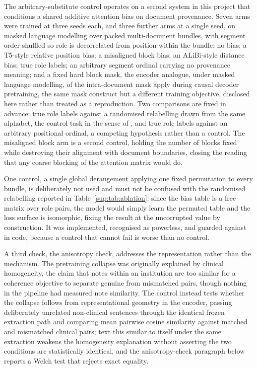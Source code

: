 The arbitrary-substitute control operates on a second system in this project that conditions a
shared additive attention bias on document provenance. Seven arms were trained at three seeds each,
and three further arms at a single seed, on masked language modelling over packed multi-document
bundles, with segment order shuffled so role is decorrelated from position within the bundle: no
bias; a T5-style relative position bias; a misaligned block bias; an ALiBi-style distance bias; true
role labels; an arbitrary segment ordinal carrying no provenance meaning; and a fixed hard block
mask, the encoder analogue, under masked language modelling, of the intra-document mask
\citet{zhao2024seqcomposition} apply during causal decoder pretraining, the same mask construct but
a different training objective, disclosed here rather than treated as a reproduction. Two
comparisons are fixed in advance: true role labels against a randomised relabelling drawn from the
same alphabet, the control task in the sense of \citet{hewitt2019control}, and true role labels
against an arbitrary positional ordinal, a competing hypothesis rather than a control. The
misaligned block arm is a second control, holding the number of blocks fixed while destroying their
alignment with document boundaries, closing the reading that any coarse blocking of the attention
matrix would do.

One control, a single global derangement applying one fixed permutation to every bundle, is
deliberately not used and must not be confused with the randomised relabelling reported in
Table~\ref{sup:tab:ablation}: since the bias table is a free matrix over role pairs, the model would
simply learn the permuted table and the loss surface is isomorphic, fixing the result at the
uncorrupted value by construction. It was implemented, recognised as powerless, and guarded against
in code, because a control that cannot fail is worse than no control.

A third check, the anisotropy check, addresses the representation rather than the mechanism.
The pretraining collapse was originally explained by clinical homogeneity, the claim that notes
within an institution are too similar for a coherence objective to separate genuine from mismatched
pairs, though nothing in the pipeline had measured note similarity. The control instead tests
whether the collapse follows from representational geometry in the encoder, passing deliberately
unrelated non-clinical sentences through the identical frozen extraction path and comparing mean
pairwise cosine similarity against matched and mismatched clinical pairs; text this similar to
itself under the same extraction weakens the homogeneity explanation without asserting the two
conditions are statistically identical, and the anisotropy-check paragraph below reports a Welch
test that rejects exact equality.




